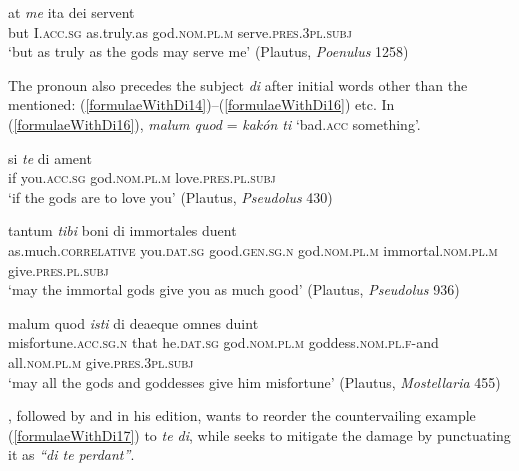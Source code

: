 \begin{exe}
\ex
\gll at \emph{me} ita dei servent\\
but I.\textsc{acc.sg} as.truly.as god.\textsc{nom.pl.m} serve.\textsc{pres.3pl.subj}\\
\trans `but as truly as the gods may serve me' (Plautus, \textit{Poenulus} 1258)
\label{formulaeWithDi13}
\end{exe}

The pronoun also precedes the subject \emph{di} after initial words other than the  mentioned: (\ref{formulaeWithDi14})--(\ref{formulaeWithDi16}) etc. In (\ref{formulaeWithDi16}), \emph{malum quod} =  \emph{kakón ti} `bad.\textsc{acc} something'.

\begin{exe}
\ex
\gll si \emph{te} di ament\\
if you.\textsc{acc.sg} god.\textsc{nom.pl.m} love.\textsc{pres.pl.subj}\\
\trans `if the gods are to love you' (Plautus, \textit{Pseudolus} 430)
\label{formulaeWithDi14}
\end{exe}

\begin{exe}
\ex
\gll tantum \emph{tibi} boni di immortales duent\\
as.much.\textsc{correlative} you.\textsc{dat.sg} good.\textsc{gen.sg.n} god.\textsc{nom.pl.m} immortal.\textsc{nom.pl.m} give.\textsc{pres.pl.subj}\\
\trans `may the immortal gods give you as much good' (Plautus, \textit{Pseudolus} 936)
\label{formulaeWithDi15}
\end{exe}

\begin{exe}
\ex
\gll malum quod \emph{isti} di deaeque omnes duint\\
misfortune.\textsc{acc.sg.n} that he.\textsc{dat.sg} god.\textsc{nom.pl.m} goddess.\textsc{nom.pl.f}-and all.\textsc{nom.pl.m} give.\textsc{pres.3pl.subj}\\
\trans `may all the gods and goddesses give him misfortune' (Plautus, \textit{Mostellaria} 455)
\label{formulaeWithDi16}
\end{exe}

\citet{Langen1857}, followed by \citet[78]{Kellerhoff1891} and \citet[70]{Schoell1890} in his edition, wants to reorder the countervailing example (\ref{formulaeWithDi17}) to \emph{te di}, while \citet{Seyffert1874} seeks to mitigate the damage by punctuating it as \emph{``di te perdant''}.

